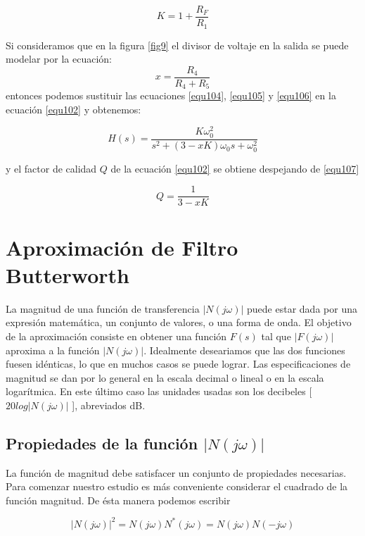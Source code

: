 \documentclass[12pt]{book}
\theoremstyle{definition}
\theoremstyle{remark}
\theoremstyle{plain}
\begin{document}
\begin{equation}
K = 1+\frac{R_F}{R_1}
\label{equ105}
\end{equation}

Si consideramos que en la figura \ref{fig9} el divisor de voltaje en la salida se puede modelar por la ecuación:
\begin{equation}
x = \frac{R_4}{R_4+R_5}
\label{equ106}
\end{equation}
 entonces podemos sustituir las ecuaciones \ref{equ104}, \ref{equ105} y \ref{equ106} en la ecuación \ref{equ102} y obtenemos:

\begin{equation}
H(s) = \frac{K \omega _0^2}{s^2+(3-x K)\omega _0 s+\omega _0 ^2}
\label{equ107}
\end{equation}

y el factor de calidad $Q$ de la ecuación \ref{equ102} se obtiene despejando de \ref{equ107}

\begin{equation}
Q= \frac{1}{3-x K}
\label{equ108}
\end{equation}

\chapter{Aproximación de Filtro Butterworth }

La magnitud de una función de transferencia $|N(j\omega)|$ puede estar dada por una expresión matemática, un conjunto de valores, o una forma de onda. El objetivo de la aproximación consiste en obtener una función $F(s)$ tal que $|F(j\omega)|$ aproxima a la función $|N(j\omega)|$. Idealmente deseariamos que las dos funciones fuesen idénticas, lo que en muchos casos se puede lograr. Las especificaciones de magnitud se dan por lo general en la escala decimal o lineal o en la escala logarítmica. En este último caso las unidades usadas son los decibeles [ $20log|N(j\omega)|$ ], abreviados dB.

\section{Propiedades de la función $|N(j\omega)|$}
La función de magnitud debe satisfacer un conjunto de propiedades necesarias. Para comenzar nuestro estudio es más conveniente considerar el cuadrado de la función magnitud. De ésta manera podemos escribir

\begin{equation}
|N(j\omega)|^2=N(j\omega) N^*(j\omega)=N(j\omega) N(-j\omega)
\label{equ109}
\end{equation}
\end{document}
